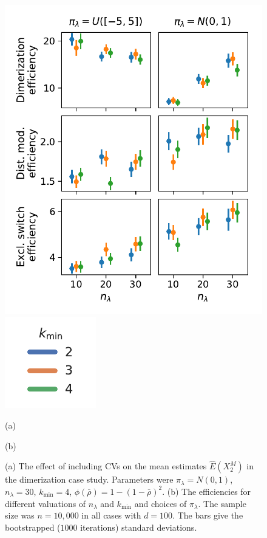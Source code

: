 \begin{figure}[t]
    \begin{minipage}{.5\textwidth}
    \centering
    \includegraphics[scale=.4]{gfx/efficiency_priors.pdf}
    \end{minipage}
    \hspace{-2em}
    \begin{minipage}{0.12\textwidth}
    \includegraphics[scale=.5]{gfx/legend.pdf}
    \end{minipage}
    \begin{minipage}{.3\textwidth}
    \hspace{2.8cm}(a)
    \end{minipage}
    \begin{minipage}{.69\textwidth}
    \centering(b)
    \end{minipage}
	\caption[\ac{CV} illustration and the influence of algorithmic parameters]{(a) The effect of including \acp{CV} on the mean estimates
    $\hat{E}(X^M_2)$ in the dimerization case study. Parameters
    were ${\pi}_{\lambda}=N(0,1)$, ${n}_{\lambda}=30$, ${k}_{\min}=4$, $\phi(\bar\rho)=1-{(1 - \bar\rho)}^2$.
    (b) The efficiencies for different valuations of ${n}_{\lambda}$ and ${k}_{\min} $
    and choices of ${\pi}_{\lambda}$. The sample size was $n=10,\!000$ in all cases
    with $d=100$.
    The bars give the 
    bootstrapped ($1000$ iterations)
    standard deviations.}
    \label{fig:efficiencies_prior}
\end{figure}

